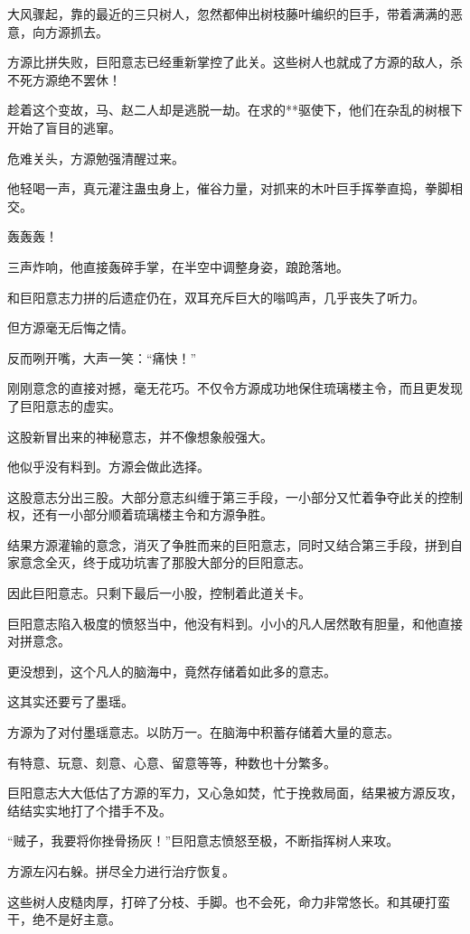 \begin{this_body}
大风骤起，靠的最近的三只树人，忽然都伸出树枝藤叶编织的巨手，带着满满的恶意，向方源抓去。

方源比拼失败，巨阳意志已经重新掌控了此关。这些树人也就成了方源的敌人，杀不死方源绝不罢休！

趁着这个变故，马、赵二人却是逃脱一劫。在求的**驱使下，他们在杂乱的树根下开始了盲目的逃窜。

危难关头，方源勉强清醒过来。

他轻喝一声，真元灌注蛊虫身上，催谷力量，对抓来的木叶巨手挥拳直捣，拳脚相交。

轰轰轰！

三声炸响，他直接轰碎手掌，在半空中调整身姿，踉跄落地。

和巨阳意志力拼的后遗症仍在，双耳充斥巨大的嗡鸣声，几乎丧失了听力。

但方源毫无后悔之情。

反而咧开嘴，大声一笑：“痛快！”

刚刚意念的直接对撼，毫无花巧。不仅令方源成功地保住琉璃楼主令，而且更发现了巨阳意志的虚实。

这股新冒出来的神秘意志，并不像想象般强大。

他似乎没有料到。方源会做此选择。

这股意志分出三股。大部分意志纠缠于第三手段，一小部分又忙着争夺此关的控制权，还有一小部分顺着琉璃楼主令和方源争胜。

结果方源灌输的意念，消灭了争胜而来的巨阳意志，同时又结合第三手段，拼到自家意念全灭，终于成功坑害了那股大部分的巨阳意志。

因此巨阳意志。只剩下最后一小股，控制着此道关卡。

巨阳意志陷入极度的愤怒当中，他没有料到。小小的凡人居然敢有胆量，和他直接对拼意念。

更没想到，这个凡人的脑海中，竟然存储着如此多的意志。

这其实还要亏了墨瑶。

方源为了对付墨瑶意志。以防万一。在脑海中积蓄存储着大量的意志。

有特意、玩意、刻意、心意、留意等等，种数也十分繁多。

巨阳意志大大低估了方源的军力，又心急如焚，忙于挽救局面，结果被方源反攻，结结实实地打了个措手不及。

“贼子，我要将你挫骨扬灰！”巨阳意志愤怒至极，不断指挥树人来攻。

方源左闪右躲。拼尽全力进行治疗恢复。

这些树人皮糙肉厚，打碎了分枝、手脚。也不会死，命力非常悠长。和其硬打蛮干，绝不是好主意。


\end{this_body}
